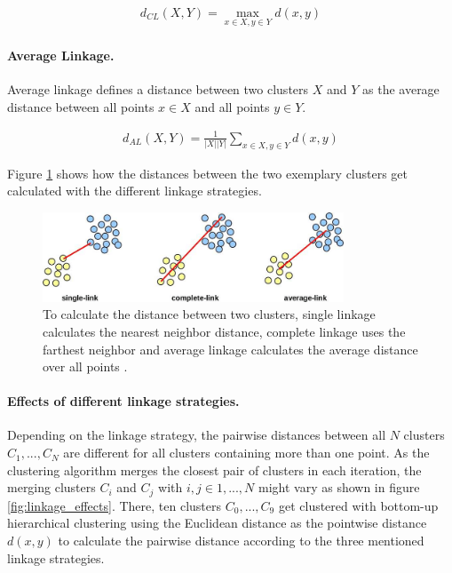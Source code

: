 \begin{equation*}
    \begin{aligned}
        d_{CL}(X,Y) = \max\limits_{x \in X, y \in Y} d(x,y)
    \end{aligned}
    \label{eq:completelinkage}
\end{equation*}

\paragraph{Average Linkage.}

Average linkage defines a distance between two clusters $X$ and $Y$ as the average distance between all points $x \in X$ and all points $y \in Y$.

\begin{equation*}
    \begin{aligned}
        d_{AL}(X,Y) = \frac{1}{|X||Y|}\sum\limits_{x \in X, y \in Y} d(x,y)
    \end{aligned}
    \label{eq:averagelinkage}
\end{equation*}

Figure \ref{fig:linkage_types} shows how the distances between the two exemplary clusters get calculated with the different linkage strategies.

\begin{figure}[h]
    \centering
    \includegraphics[width=0.8\textwidth]{images/linkage_types}
    \caption{To calculate the distance between two clusters, single linkage calculates the nearest neighbor distance, complete linkage uses the farthest neighbor and average linkage calculates the average distance over all points \cite{linkage_types}.}
    \label{fig:linkage_types}
\end{figure}

\paragraph{Effects of different linkage strategies.}

Depending on the linkage strategy, the pairwise distances between all $N$ clusters $C_1, ..., C_N$ are different for all clusters containing more than one point. As the clustering algorithm merges the closest pair of clusters in each iteration, the merging clusters $C_i$ and $C_j$ with $i, j \in 1,...,N$ might vary as shown in figure \ref{fig:linkage_effects}. There, ten clusters $C_0, ..., C_9$ get clustered with bottom-up hierarchical clustering using the Euclidean distance as the pointwise distance $d(x,y)$ to calculate the pairwise distance according to the three mentioned linkage strategies.

